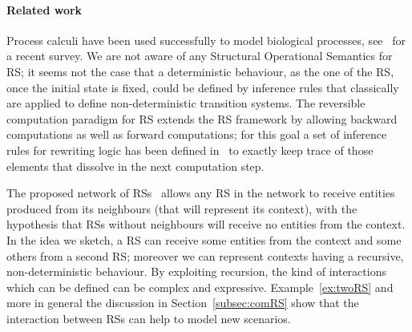
\paragraph{Related work}

Process calculi have been used successfully to model
biological processes, see~\cite{BBDFH18} for a recent survey.
We are not aware of any 
Structural Operational Semantics for RS; it seems not the case
that a deterministic behaviour, as the one of the RS, once the initial state is 
fixed, could be defined by inference rules that classically are applied 
to define non-deterministic transition systems.
The reversible computation paradigm for RS extends the RS framework  by
allowing  backward computations as well as forward computations; for this 
goal a set of inference rules for rewriting logic has been 
defined in~\cite{10.1007/978-3-319-73359-3_3}
to exactly keep trace of those elements that  dissolve in the next 
computation step.

%
The proposed network of RSs~\cite{BLR20} allows
any RS in the network to receive entities 
produced from its neighbours (that will represent its context), with the hypothesis that  
RSs without neighbours will receive no entities 
from the context. 
In the idea we sketch, a RS can receive some entities from the context and some others from a second RS; moreover we can represent contexts having a recursive, non-deterministic behaviour.
%
By exploiting recursion, the kind of interactions which can be 
defined can be complex and expressive.
Example~\ref{ex:twoRS} and more in general the discussion in 
Section~\ref{subsec:comRS}
 show that 
the interaction between RSs can help to model new scenarios.



